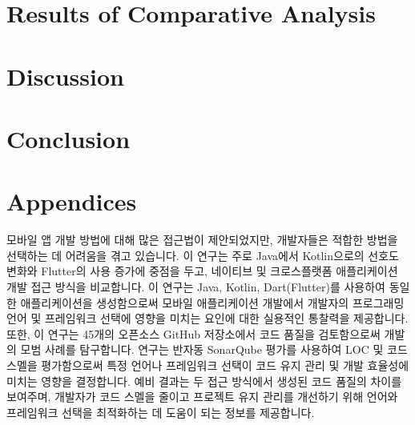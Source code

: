 \documentclass[11pt,jaso]{pnumasterh}
\begin{document}
\section{Results of Comparative Analysis} \label{results}


\section{Discussion}

\clearpage

\section{Conclusion}

\clearpage
\nocite{*}


\clearpage

\appendix
\section*{Appendices}

\clearpage

\begin{eabstract}
    모바일 앱 개발 방법에 대해 많은 접근법이 제안되었지만, 개발자들은 적합한 방법을 선택하는 데 어려움을 겪고 있습니다. 이 연구는 주로 Java에서 Kotlin으로의 선호도 변화와 Flutter의 사용 증가에 중점을 두고, 네이티브 및 크로스플랫폼 애플리케이션 개발 접근 방식을 비교합니다. 이 연구는 Java, Kotlin, Dart(Flutter)를 사용하여 동일한 애플리케이션을 생성함으로써 모바일 애플리케이션 개발에서 개발자의 프로그래밍 언어 및 프레임워크 선택에 영향을 미치는 요인에 대한 실용적인 통찰력을 제공합니다. 또한, 이 연구는 45개의 오픈소스 GitHub 저장소에서 코드 품질을 검토함으로써 개발의 모범 사례를 탐구합니다. 연구는 반자동 SonarQube 평가를 사용하여 LOC 및 코드 스멜을 평가함으로써 특정 언어나 프레임워크 선택이 코드 유지 관리 및 개발 효율성에 미치는 영향을 결정합니다. 예비 결과는 두 접근 방식에서 생성된 코드 품질의 차이를 보여주며, 개발자가 코드 스멜을 줄이고 프로젝트 유지 관리를 개선하기 위해 언어와 프레임워크 선택을 최적화하는 데 도움이 되는 정보를 제공합니다.
\end{eabstract}

% 
\end{document}
